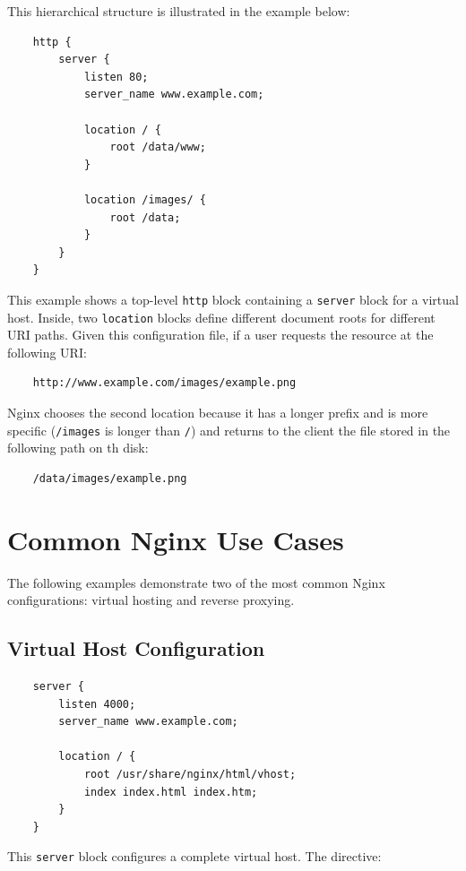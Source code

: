 \documentclass{scrbook}
\begin{document}
	This hierarchical structure is illustrated in the example below:
	\begin{lstlisting}
	http {
	    server {
	        listen 80;
	        server_name www.example.com;
	
	        location / {
	            root /data/www;
	        }
	
	        location /images/ {
	            root /data;
	        }
	    }
	}
	\end{lstlisting}
	
	This example shows a top-level \texttt{http} block containing a \texttt{server} block for a virtual host. Inside, two \texttt{location} blocks define different document roots for different URI paths. Given this configuration file, if a user requests the resource at the following URI:
	
	\begin{lstlisting}
	http://www.example.com/images/example.png
	\end{lstlisting}
	
	Nginx chooses the second location because it has a longer prefix and is more specific (\texttt{/images} is longer than \texttt{/}) and returns to the client the file stored in the following path on th disk:
	
	\begin{lstlisting}
	/data/images/example.png
	\end{lstlisting}
	
	\section{Common Nginx Use Cases}
	
	The following examples demonstrate two of the most common Nginx configurations: virtual hosting and reverse proxying.
	
	\subsection{Virtual Host Configuration}
	
	\begin{lstlisting}
	server {
		listen 4000;
		server_name www.example.com;
	
		location / {
			root /usr/share/nginx/html/vhost;
			index index.html index.htm;
		}
	}
	\end{lstlisting}
	
	This \texttt{server} block configures a complete virtual host. The directive:
	
\end{document}
